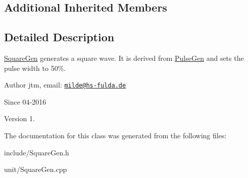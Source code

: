 \subsection*{Additional Inherited Members}


\subsection{Detailed Description}
\hyperlink{classunit_1_1SquareGen}{Square\+Gen} generates a square wave. It is derived from \hyperlink{classunit_1_1PulseGen}{Pulse\+Gen} and sets the pulse width to 50\%.

\begin{DoxyAuthor}{Author}
jtm, email\+:  \href{mailto:milde@hs-fulda.de}{\tt milde@hs-\/fulda.\+de} 
\end{DoxyAuthor}
\begin{DoxySince}{Since}
04-\/2016 
\end{DoxySince}
\begin{DoxyVersion}{Version}
1. 
\end{DoxyVersion}


The documentation for this class was generated from the following files\+:\begin{DoxyCompactItemize}
\item 
include/Square\+Gen.\+h\item 
unit/Square\+Gen.\+cpp\end{DoxyCompactItemize}
